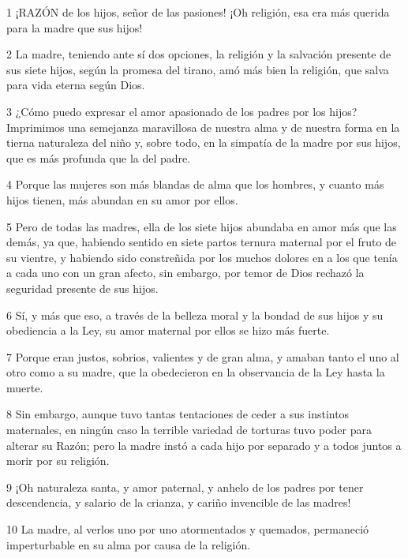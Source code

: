 \par 1 ¡RAZÓN de los hijos, señor de las pasiones! ¡Oh religión, esa era más querida para la madre que sus hijos!

\par 2 La madre, teniendo ante sí dos opciones, la religión y la salvación presente de sus siete hijos, según la promesa del tirano, amó más bien la religión, que salva para vida eterna según Dios.

\par 3 ¿Cómo puedo expresar el amor apasionado de los padres por los hijos? Imprimimos una semejanza maravillosa de nuestra alma y de nuestra forma en la tierna naturaleza del niño y, sobre todo, en la simpatía de la madre por sus hijos, que es más profunda que la del padre.

\par 4 Porque las mujeres son más blandas de alma que los hombres, y cuanto más hijos tienen, más abundan en su amor por ellos.

\par 5 Pero de todas las madres, ella de los siete hijos abundaba en amor más que las demás, ya que, habiendo sentido en siete partos ternura maternal por el fruto de su vientre, y habiendo sido constreñida por los muchos dolores en a los que tenía a cada uno con un gran afecto, sin embargo, por temor de Dios rechazó la seguridad presente de sus hijos.

\par 6 Sí, y más que eso, a través de la belleza moral y la bondad de sus hijos y su obediencia a la Ley, su amor maternal por ellos se hizo más fuerte.

\par 7 Porque eran justos, sobrios, valientes y de gran alma, y ​​amaban tanto el uno al otro como a su madre, que la obedecieron en la observancia de la Ley hasta la muerte.

\par 8 Sin embargo, aunque tuvo tantas tentaciones de ceder a sus instintos maternales, en ningún caso la terrible variedad de torturas tuvo poder para alterar su Razón; pero la madre instó a cada hijo por separado y a todos juntos a morir por su religión.

\par 9 ¡Oh naturaleza santa, y amor paternal, y anhelo de los padres por tener descendencia, y salario de la crianza, y cariño invencible de las madres!

\par 10 La madre, al verlos uno por uno atormentados y quemados, permaneció imperturbable en su alma por causa de la religión.

